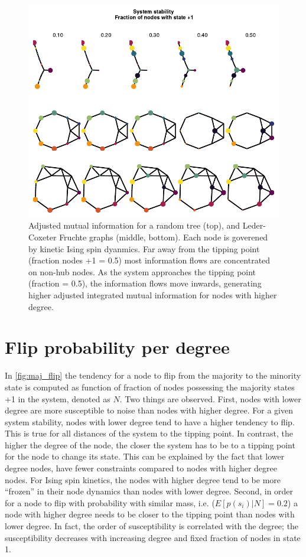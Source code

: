 \documentclass[a4paper, 11pt, twocolumn]{article}
\begin{document}
\begin{figure}
\centering
\includegraphics[width=.9\linewidth]{./figures/imi_other_graphs.pdf}
\caption{\label{fig:other_systems}Adjusted mutual information for a random tree (top), and Leder-Coxeter Fruchte graphs (middle, bottom). Each node is goverened by kinetic Ising spin dyanmics. Far away from the tipping point (fraction nodes +1 = 0.5) most information flows are concentrated on non-hub nodes. As the system approaches the tipping point (fraction = 0.5), the information flows move inwards, generating higher adjusted integrated mutual information for nodes with higher degree.}
\end{figure}





\section{Flip probability per degree}
\label{sec:deg_flip}
In \cref{fig:maj_flip}  the tendency for a  node to flip
from  the majority  to  the minority  state  is computed  as
function of fraction of nodes possessing the majority states
+1 in the  system, denoted as $N$. Two  things are observed.
First, nodes with lower degree are more susceptible to noise
than nodes with higher degree.  For a given system stability,
nodes with lower degree tend  to have a higher tendency
to flip. This is true for all distances of the system to the
tipping point.  In contrast,  the higher  the degree  of the
node, the closer the system has to be to a tipping point for
the node to  change its state. This can be  explained by the
fact that lower degree nodes, have fewer constraints compared
to nodes with higher degree  nodes. For Ising spin kinetics,
the nodes  with higher  degree tend to  be more  ``frozen'' in
their node dynamics than nodes with lower degree. Second, in
order for a node to flip with probability with similar mass,
i.e. ($E[p(s_i) |  N] = 0.2$) a node with  higher degree needs
to  be closer  to the  tipping point  than nodes  with lower
degree. In  fact, the order of  susceptibility is correlated
with   the  degree;   the   susceptibility  decreases   with
increasing degree and fixed fraction of nodes in state 1.
\end{document}
